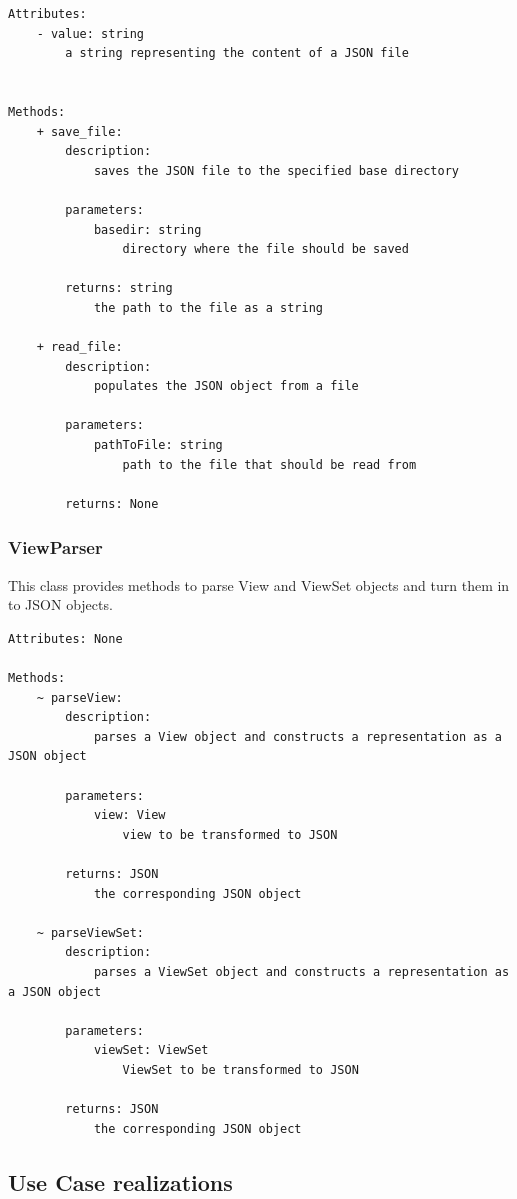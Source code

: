 \documentclass[12pt]{extarticle}
\begin{document}
\begin{lstlisting}
Attributes:
    - value: string
        a string representing the content of a JSON file
        
        
Methods:
    + save_file:
        description:
            saves the JSON file to the specified base directory
            
        parameters:
            basedir: string
                directory where the file should be saved
        
        returns: string
            the path to the file as a string
            
    + read_file:
        description:
            populates the JSON object from a file
            
        parameters:
            pathToFile: string
                path to the file that should be read from
                
        returns: None
\end{lstlisting}

\subsubsection{ViewParser}

This class provides methods to parse View and ViewSet objects and turn them in to JSON objects.

\begin{lstlisting}
Attributes: None

Methods:
    ~ parseView:
        description:
            parses a View object and constructs a representation as a JSON object
            
        parameters:
            view: View
                view to be transformed to JSON
        
        returns: JSON
            the corresponding JSON object
            
    ~ parseViewSet:
        description:
            parses a ViewSet object and constructs a representation as a JSON object
            
        parameters:
            viewSet: ViewSet
                ViewSet to be transformed to JSON
        
        returns: JSON
            the corresponding JSON object
\end{lstlisting}

\subsection{Use Case realizations}
\end{document}
